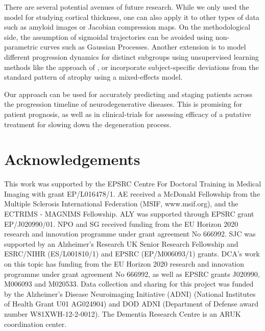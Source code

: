 \documentclass{llncs}
\begin{document}
There are several potential avenues of future research. While we only used the model for studying cortical thickness, one can also apply it to other types of data such as amyloid images or Jacobian compression maps. On the methodological side, the assumption of sigmoidal trajectories can be avoided using non-parametric curves such as Gaussian Processes. Another extension is to model different progression dynamics for distinct subgroups using unsupervised learning methods like the approach of \cite{young2015multiple}, or incorporate subject-specific deviations from the standard pattern of atrophy using a mixed-effects model.

Our approach can be used for accurately predicting and staging patients across the progression timeline of neurodegenerative diseases. This is promising for patient prognosis, as well as in clinical-trials for assessing efficacy of a putative treatment for slowing down the degeneration process.

\section{Acknowledgements}

This work was supported by the EPSRC Centre For Doctoral Training in Medical Imaging with grant EP/L016478/1. AE received a McDonald Fellowship from the Multiple Sclerosis International Federation (MSIF, www.msif.org), and the ECTRIMS - MAGNIMS Fellowship. ALY was supported through EPSRC grant EP/J020990/01. NPO and SG received funding from the EU Horizon 2020 research and innovation programme under grant agreement No 666992. SJC was supported by an Alzheimer’s Research UK Senior Research Fellowship and ESRC/NIHR (ES/L001810/1) and EPSRC (EP/M006093/1) grants. DCA's work on this topic has funding from the EU Horizon 2020 research and innovation programme under grant agreement No 666992, as well as EPSRC grants J020990, M006093 and M020533. Data collection and sharing for this project was funded by the Alzheimer's Disease Neuroimaging Initiative (ADNI) (National Institutes of Health Grant U01 AG024904) and DOD ADNI (Department of Defense award number W81XWH-12-2-0012). The Dementia Research Centre is an ARUK coordination center.


%
\end{document}
